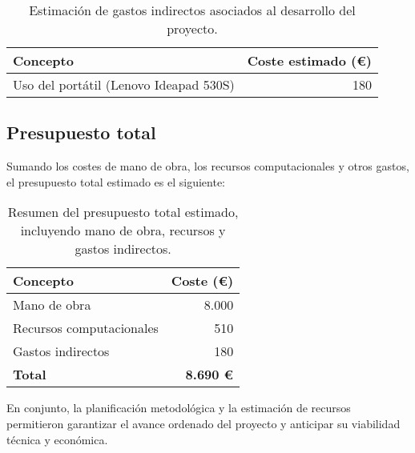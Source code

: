 \begin{table}[htp]
    \centering
    \begin{tabular}{|l|r|}
        \hline
        \textbf{Concepto}                      & \textbf{Coste estimado (€)} \\ \hline
        Uso del portátil (Lenovo Ideapad 530S) & 180                         \\ \hline
    \end{tabular}
    \caption{Estimación de gastos indirectos asociados al desarrollo del proyecto.}
    \label{tab:gastos-indirectos}
\end{table}


\subsection{Presupuesto total}\label{subsec:presupuesto-total}
Sumando los costes de mano de obra, los recursos computacionales y otros gastos, el presupuesto total estimado es el
siguiente:

\begin{table}[htp]
    \centering
    \begin{tabular}{|l|r|}
        \hline
        \textbf{Concepto}        & \textbf{Coste (€)} \\ \hline
        Mano de obra             & 8.000              \\
        Recursos computacionales & 510                \\
        Gastos indirectos        & 180                \\ \hline
        \textbf{Total}           & \textbf{8.690 €}   \\ \hline
    \end{tabular}
    \caption{Resumen del presupuesto total estimado, incluyendo mano de obra, recursos y gastos indirectos.}
    \label{tab:presupuesto-total}
\end{table}

En conjunto, la planificación metodológica y la estimación de recursos permitieron garantizar el avance
ordenado del proyecto y anticipar su viabilidad técnica y económica.